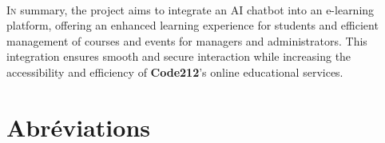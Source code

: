 \documentclass[a4paper, 11pt, openany]{report}
\begin{document}
\ \\

\lettrine[nindent=0em, slope=-.5em]{\color{Eblue}I}{n} summary, the project aims to integrate an AI chatbot into an e-learning platform, offering an enhanced learning experience for students and efficient management of courses and events for managers and administrators. This integration ensures smooth and secure interaction while increasing the accessibility and efficiency of \textbf{Code212}'s online educational services.
\newpage

\tableofcontents
\listoffigures
\listoftables



\newpage
\chapter*{Abréviations}
\end{document}

